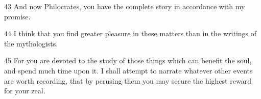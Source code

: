 \par 43 And now Philocrates, you have the complete story in accordance with my promise.

\par 44 I think that you find greater pleasure in these matters than in the writings of the mythologists.

\par 45 For you are devoted to the study of those things which can benefit the soul, and spend much time upon it. I shall attempt to narrate whatever other events are worth recording, that by perusing them you may secure the highest reward for your zeal.


